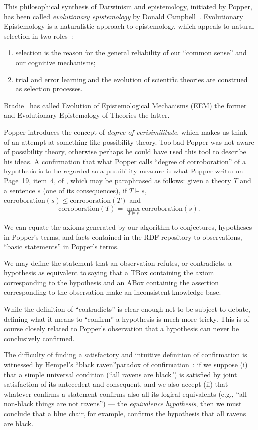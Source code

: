 \documentclass[a4paper]{article}
\newcounter{ex}
\begin{document}
This philosophical synthesis of Darwinism and epistemology, initiated by Popper,
has been called \emph{evolutionary epistemology} by Donald Campbell~\cite{Campbell1974}.
Evolutionary Epistemology is a naturalistic approach to epistemology,
which appeals to natural selection in two roles~\cite{BradieHarms2012}:
\begin{enumerate}
\item selection is the reason for the general reliability of our ``common sense''
  and our cognitive mechanisms;
\item trial and error learning and the evolution of scientific theories
  are construed as selection processes.
\end{enumerate}
Bradie~\cite{Bradie1986} has called Evolution of Epistemological Mechanisms (EEM)
the former and Evolutionary Epistemology of Theories the latter.

Popper introduces the concept of \emph{degree of verisimilitude}, which makes us think
of an attempt at something like possibility theory.
Too bad Popper was not aware of possibility theory, otherwise perhaps he could have used
this tool to describe his ideas.
A confirmation that what Popper calls ``degree of corroboration'' of a hypothesis
is to be regarded as a possibility measure is what Popper writes on Page~19,
item~4, of \cite{Popper1972}, which may be paraphrased as follows:
given a theory $T$ and a sentence $s$ (one of its consequences),
if $T \models s$, $\mathrm{corroboration}(s) \leq \mathrm{corroboration}(T)$
and
\[
  \mathrm{corroboration}(T) = \max_{T \models s} \mathrm{corroboration}(s).
\]

We can equate the axioms generated by our algorithm to conjectures, hypotheses
in Popper's terms, and facts contained in the RDF repository to observations,
``basic statements'' in Popper's terms.

We may define the statement that an observation refutes, or contradicts, a hypothesis
as equivalent to saying that a TBox containing the axiom corresponding to the hypothesis
and an ABox containing the assertion corresponding to the observation make an
inconsistent knowledge base.

While the definition of ``contradicts'' is clear enough not to be subject to debate,
defining what it means to ``confirm'' a hypothesis is much more tricky. This is
of course closely related to Popper's observation that a hypothesis can never be
conclusively confirmed.

The difficulty of finding a satisfactory and intuitive definition of confirmation
is witnessed by Hempel's ``black raven''paradox of confirmation~\cite{Hempel1945}:
if we suppose (i) that a simple universal condition (``all ravens are black'')
is satisfied by joint satisfaction of its antecedent and consequent, and we
also accept (ii) that whatever confirms a statement confirms also all its logical
equivalents (e.g., ``all non-black things are not ravens'') --- the \emph{equivalence hypothesis},
then we must conclude that a blue chair, for example, confirms the hypothesis
that all ravens are black.
\end{document}
